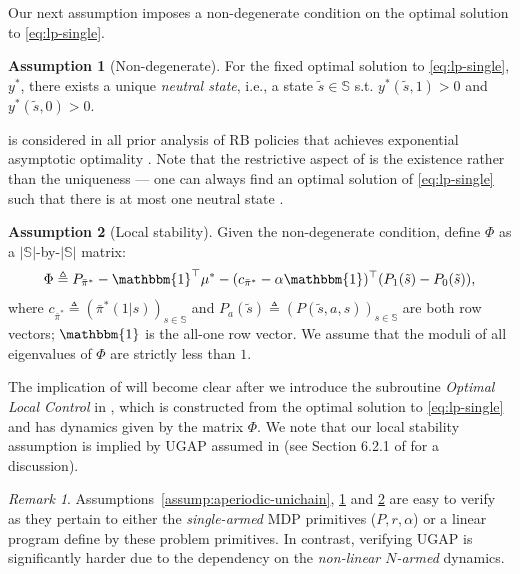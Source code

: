 \documentclass[11pt,letterpaper]{article}
\theoremstyle{plain}
\theoremstyle{definition}
\newtheorem{assumption}{Assumption}
\theoremstyle{remark}
\newtheorem{remark}{\textit{Remark}}
\newcommand{\vone}{\mathbbm{1}}
\newcommand{\sspa}{\mathbb{S}}
\newcommand{\pibar}{{\sysbar{\pi}}}
\newcommand{\pibs}{{\pibar^*}}
\newcommand{\sysbar}[1]{\bar{#1}}
\newcommand{\costvec}{c_\pibs}
\newcommand{\statdist}{\mu^*}
\newcommand{\sneu}{\tilde{s}}
\begin{document}
Our next assumption imposes a non-degenerate condition on the optimal solution to \eqref{eq:lp-single}. 

\begin{assumption}[Non-degenerate]\label{assump:non-degeneracy}
    For the fixed optimal solution to \eqref{eq:lp-single}, $y^*$, 
    there exists a unique \emph{neutral state}, i.e., a state $\sneu\in\sspa$ s.t. $y^*(\sneu, 1) > 0$ and $y^*(\sneu, 0) > 0$. 
\end{assumption}

 is considered in all prior analysis of RB policies that achieves exponential asymptotic optimality \citep{GasGauYan_23_exponential,GasGauYan_23_whittles}. 
Note that the restrictive aspect of  is the existence rather than the uniqueness --- one can always find an optimal solution of \eqref{eq:lp-single} such that there is at most one neutral state \citep[][Proposition~2]{GasGauYan_23_exponential}. 


\begin{assumption}[Local stability]\label{assump:local-stability}
    Given the non-degenerate condition, 
    define $\Phi$ as a $|\sspa|$-by-$|\sspa|$ matrix:  
    \begin{equation}\label{eq:phi-def}
        \Phi \triangleq P_\pibs - \vone^\top \statdist - (\costvec-\alpha\vone)^\top  (P_1(\sneu) - P_0(\sneu)), 
    \end{equation}
    where $\costvec \triangleq (\pibs(1|s))_{s\in\sspa}$ and $P_a(\sneu) \triangleq (P(\sneu,a, s))_{s\in\sspa}$ are both row vectors; $\vone$ is the all-one row vector. 
    We assume that the moduli of all eigenvalues of $\Phi$ are strictly less than $1$. 
\end{assumption}

 
The implication of  will become clear after we introduce the subroutine \emph{Optimal Local Control} in , which is constructed from the optimal solution to \eqref{eq:lp-single} and has dynamics given by the matrix $\Phi$. 
We note that our local stability assumption is implied by UGAP assumed in \cite{GasGauYan_23_exponential,GasGauYan_23_whittles} (see Section 6.2.1 of \cite{GasGauYan_23_exponential} for a discussion). 



\begin{remark}
    Assumptions~\ref{assump:aperiodic-unichain}, \ref{assump:non-degeneracy} and \ref{assump:local-stability} are easy to verify as they pertain to either the \emph{single-armed}  MDP primitives ($P, r, \alpha$) or a linear program define by these problem primitives. 
    In contrast, verifying UGAP is significantly harder due to the dependency on the \emph{non-linear $N$-armed} dynamics. 
\end{remark}
\end{document}

